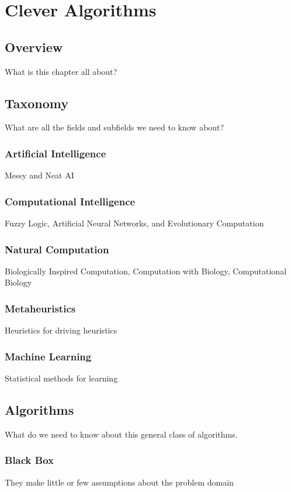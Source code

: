 \chapter{Clever Algorithms}
\label{chap:field}

\section{Overview}
What is this chapter all about?


\section{Taxonomy}
What are all the fields and subfields we need to know about?

\subsection{Artificial Intelligence}
Messy and Neat AI

\subsection{Computational Intelligence}
Fuzzy Logic, Artificial Neural Networks, and Evolutionary Computation

\subsection{Natural Computation}
Biologically Inspired Computation, Computation with Biology, Computational Biology 

\subsection{Metaheuristics}
Heuristics for driving heuristics

\subsection{Machine Learning}
Statistical methods for learning


\section{Algorithms}
What do we need to know about this general class of algorithms.

\subsection{Black Box}
They make little or few assumptions about the problem domain

